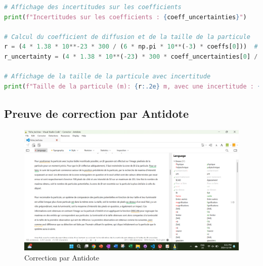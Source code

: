 \documentclass[11pt,letterpaper]{article}
\begin{document}
\begin{lstlisting}[language=python]
# Affichage des incertitudes sur les coefficients
print(f"Incertitudes sur les coefficients : {coeff_uncertainties}")

# Calcul du coefficient de diffusion et de la taille de la particule
r = (4 * 1.38 * 10**-23 * 300 / (6 * np.pi * 10**(-3) * coeffs[0]))  # Coefficient de diffusion
r_uncertainty = (4 * 1.38 * 10**(-23) * 300 * coeff_uncertainties[0] / (6 * np.pi * 10**(-3) * (coeffs[0])**2))  # Coefficient de diffusion

# Affichage de la taille de la particule avec incertitude
print(f"Taille de la particule (m): {r:.2e} m, avec une incertitude : {r_uncertainty:.2e}")
\end{lstlisting}

\subsection{Preuve de correction par Antidote}
\begin{figure}[H]
  \centering
  \includegraphics[scale=0.2]{Screenshot (1).png}
  \caption{Correction par Antidote}
\end{figure}
\clearpage



\end{document}
